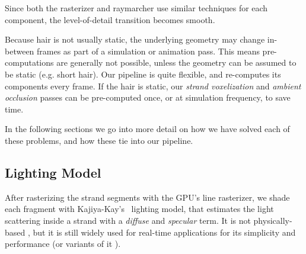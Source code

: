 \documentclass{egpubl}
\begin{document}
Since both the rasterizer and raymarcher use similar techniques for each component, the level-of-detail transition becomes smooth.


Because hair is not usually static, the underlying geometry may change in-between frames as part of a simulation or animation pass. This means pre-computations are generally not possible, unless the geometry can be assumed to be static (e.g. short hair). Our pipeline is quite flexible, and re-computes its components every frame. If the hair is static, our \emph{strand voxelization} and \emph{ambient occlusion} passes can be pre-computed once, or at simulation frequency, to save time.

In the following sections we go into more detail on how we have solved each of these problems, and how these tie into our pipeline.

\vspace{-0.8em}

\subsection{Lighting Model} \label{sec:lighting_model}


After rasterizing the strand segments with the GPU's line rasterizer, we shade each fragment with Kajiya-Kay's~\cite{kajiya1989rendering} lighting model, that estimates the light scattering inside a strand with a \emph{diffuse} and \emph{specular} term. It is not physically-based \cite{marschner2003light, d2011energy}, but it is still widely used \cite{ward2007survey, yuksel2010advanced} for real-time applications for its simplicity and performance (or variants of it \cite{scheuermann2004practical, martin2014tressfx}).

\end{document}
